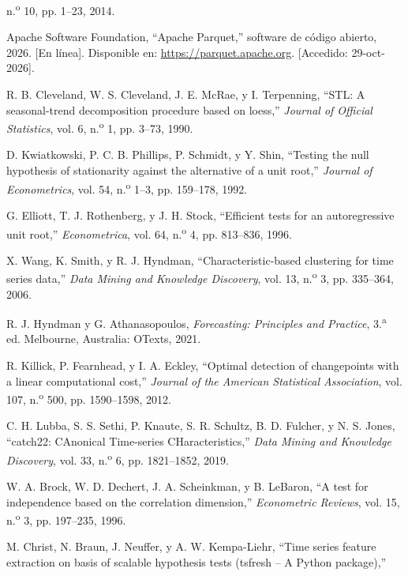 \documentclass[12pt,letterpaper]{report}
\begin{document}
{\begin{enumerate}[label={[\arabic*]}, leftmargin=*, itemsep=0pt, parsep=0pt, topsep=0pt]
n.\textsuperscript{o} 10, pp. 1--23, 2014.
\item\label{bib:11} Apache Software Foundation, ``Apache Parquet,'' software de código abierto, 2026.
[En línea]. Disponible en: \url{https://parquet.apache.org}. [Accedido: 29-oct-2026].
\item\label{bib:12} R. B. Cleveland, W. S. Cleveland, J. E. McRae, y I. Terpenning, ``STL: A seasonal-trend decomposition procedure based on loess,'' \textit{Journal of Official Statistics}, vol. 6, n.\textsuperscript{o} 1, pp. 3--73, 1990.
\item\label{bib:13} D. Kwiatkowski, P. C. B. Phillips, P. Schmidt, y Y. Shin, ``Testing the null hypothesis of stationarity against the alternative of a unit root,'' \textit{Journal of Econometrics}, vol. 54, n.\textsuperscript{o} 1--3, pp. 159--178, 1992.
\item\label{bib:14} G. Elliott, T. J. Rothenberg, y J. H. Stock, ``Efficient tests for
an autoregressive unit root,'' \textit{Econometrica}, vol. 64, n.\textsuperscript{o} 4,
pp. 813--836, 1996.
\item\label{bib:15} X. Wang, K. Smith, y R. J. Hyndman, ``Characteristic-based
clustering for time series data,'' \textit{Data Mining and Knowledge Discovery},
vol. 13, n.\textsuperscript{o} 3, pp. 335--364, 2006.
\item\label{bib:16} R. J. Hyndman y G. Athanasopoulos, \textit{Forecasting: Principles and Practice}, 3.\textsuperscript{a} ed. Melbourne, Australia: OTexts, 2021.
\item\label{bib:17} R. Killick, P. Fearnhead, y I. A. Eckley, ``Optimal detection of
changepoints with a linear computational cost,'' \textit{Journal of the American
Statistical Association}, vol. 107, n.\textsuperscript{o} 500, pp. 1590--1598, 2012.
\item\label{bib:18} C. H. Lubba, S. S. Sethi, P. Knaute, S. R. Schultz, B. D. Fulcher,
y N. S. Jones, ``catch22: CAnonical Time-series CHaracteristics,'' \textit{Data Mining
and Knowledge Discovery}, vol. 33, n.\textsuperscript{o} 6, pp. 1821--1852, 2019.
\item\label{bib:19} W. A. Brock, W. D. Dechert, J. A. Scheinkman, y B. LeBaron, ``A test
for independence based on the correlation dimension,'' \textit{Econometric Reviews},
vol. 15, n.\textsuperscript{o} 3, pp. 197--235, 1996.
\item\label{bib:20} M. Christ, N. Braun, J. Neuffer, y A. W. Kempa-Liehr, ``Time series
feature extraction on basis of scalable hypothesis tests (tsfresh -- A Python package),''

\end{enumerate}}
\end{document}

